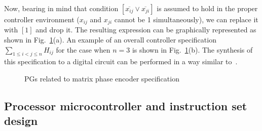 Now, bearing in mind that condition $[\overline{x_{ij}}\vee\overline{x_{ji}}]$
is assumed to hold in the proper controller environment ($x_{ij}$
and $x_{ji}$ cannot be 1 simultaneously), we can replace it with
$[1]$ and drop it. The resulting expression can be graphically represented
as shown in Fig.~\ref{fig:CGs-related-to}(a). An example of an overall
controller specification ${\displaystyle \sum_{1\le i<j\le n}}H_{ij}$
for the case when $n=3$ is shown in Fig.~\ref{fig:CGs-related-to}(b).
The synthesis of this specification to a digital circuit can be performed
in a way similar to~\cite{2010_mokhov_ieee}.

\begin{figure}
\hfill{}\hfill{}\hfill{}

\caption{PGs related to matrix phase encoder specification\label{fig:CGs-related-to}}
\vspace{-6mm}
\end{figure}



\subsection{Processor microcontroller and instruction set design}

